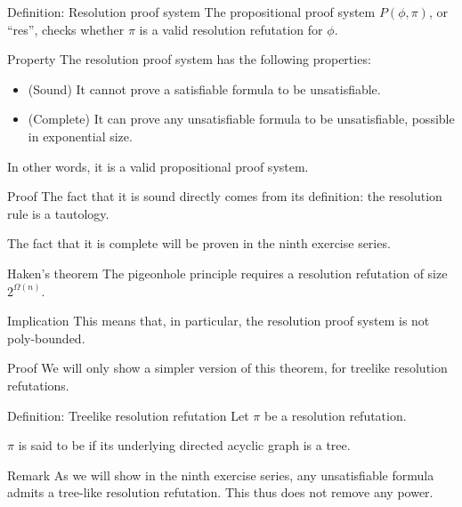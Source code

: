 \documentclass[a4paper]{article}
\begin{document}
\begin{parag}{Definition: Resolution proof system}
    The  propositional proof system $P\left(\phi, \pi\right)$, or ``res'', checks whether $\pi$ is a valid resolution refutation for $\phi$.
\end{parag}

\begin{parag}{Property}
    The resolution proof system has the following properties:
    \begin{itemize}[left=0pt]
        \item (Sound) It cannot prove a satisfiable formula to be unsatisfiable.
        \item (Complete) It can prove any unsatisfiable formula to be unsatisfiable, possible in exponential size.
    \end{itemize}

    In other words, it is a valid propositional proof system.

    \begin{subparag}{Proof}
        The fact that it is sound directly comes from its definition: the resolution rule is a tautology.

        The fact that it is complete will be proven in the ninth exercise series.
    \end{subparag}
\end{parag}

\begin{parag}{Haken's theorem}
    The pigeonhole principle requires a resolution refutation of size $2^{\Omega\left(n\right)}$.

    \begin{subparag}{Implication}
        This means that, in particular, the resolution proof system is not poly-bounded.
    \end{subparag}

    \begin{subparag}{Proof}
        We will only show a simpler version of this theorem, for treelike resolution refutations.
    \end{subparag}
\end{parag}

\begin{parag}{Definition: Treelike resolution refutation}
    Let $\pi$ be a resolution refutation.

    $\pi$ is said to be  if its underlying directed acyclic graph is a tree. 

    \begin{subparag}{Remark}
        As we will show in the ninth exercise series, any unsatisfiable formula admits a tree-like resolution refutation. This thus does not remove any power.
    \end{subparag}
\end{parag}
\end{document}
